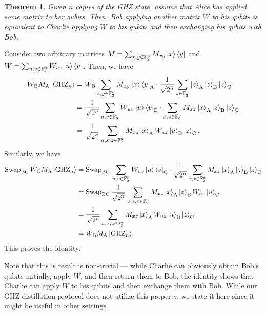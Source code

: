 \documentclass[journal,onecolumn]{IEEEtran}
\newtheorem{theorem}{Theorem}
\newcommand{\dket}[1]{\left\lvert #1 \right\rangle}
\begin{document}
\begin{theorem}
Given $n$ copies of the GHZ state, assume that Alice has applied some matrix to her qubits. 
Then, Bob applying another matrix $W$ to his qubits is equivalent to Charlie applying $W$ to his qubits and then exchanging his qubits with Bob.
\end{theorem}
\begin{IEEEproof}
Consider two arbitrary matrices $M = \sum_{x,y \in \mathbb{F}_2^n} M_{xy} \dketbra{x}{y}$ and $W = \sum_{u,v \in \mathbb{F}_2^n} W_{uv} \dketbra{u}{v}$.
Then, we have
\begin{align}
W_{\text{B}} M_{\text{A}} \dket{\text{GHZ}_n} & = W_{\text{B}} \sum_{x,y \in \mathbb{F}_2^n} M_{xy} \dketbra{x}{y}_{\text{A}} \cdot \frac{1}{\sqrt{2^n}} \sum_{z \in \mathbb{F}_2^n} \dket{z}_{\text{A}} \dket{z}_{\text{B}} \dket{z}_{\text{C}} \\
%
  & = \frac{1}{\sqrt{2^n}} \sum_{u,v \in \mathbb{F}_2^n} W_{uv} \dketbra{u}{v}_{\text{B}} \cdot \sum_{x,z \in \mathbb{F}_2^n} M_{xz} \dket{x}_{\text{A}} \dket{z}_{\text{B}} \dket{z}_{\text{C}} \\
%
  & = \frac{1}{\sqrt{2^n}} \sum_{u,x,z \in \mathbb{F}_2^n} M_{xz} \dket{x}_{\text{A}} W_{uz} \dket{u}_{\text{B}} \dket{z}_{\text{C}}.
\end{align}
Similarly, we have
\begin{align}
\text{Swap}_{\text{BC}} \, W_{\text{C}} M_{\text{A}} \dket{\text{GHZ}_n} & = \text{Swap}_{\text{BC}} \, \sum_{u,v \in \mathbb{F}_2^n} W_{uv} \dketbra{u}{v}_{\text{C}} \cdot \frac{1}{\sqrt{2^n}} \sum_{x,z \in \mathbb{F}_2^n} M_{xz} \dket{x}_{\text{A}} \dket{z}_{\text{B}} \dket{z}_{\text{C}} \\
%
  & = \text{Swap}_{\text{BC}} \, \frac{1}{\sqrt{2^n}} \sum_{u,x,z \in \mathbb{F}_2^n} M_{xz} \dket{x}_{\text{A}} \dket{z}_{\text{B}} W_{uz} \dket{u}_{\text{C}} \\
%
  & = \frac{1}{\sqrt{2^n}} \sum_{u,x,z \in \mathbb{F}_2^n} M_{xz} \dket{x}_{\text{A}} W_{uz} \dket{u}_{\text{B}} \dket{z}_{\text{C}} \\
%
  & = W_{\text{B}} M_{\text{A}} \dket{\text{GHZ}_n}.
\end{align}
This proves the identity.
\end{IEEEproof}

Note that this is result is non-trivial --- while Charlie can obviously obtain Bob's qubits initially, apply $W$, and then return them to Bob, the identity shows that Charlie can apply $W$ to his qubits and then exchange them with Bob.
While our GHZ distillation protocol does not utilize this property, we state it here since it might be useful in other settings.
\end{document}
